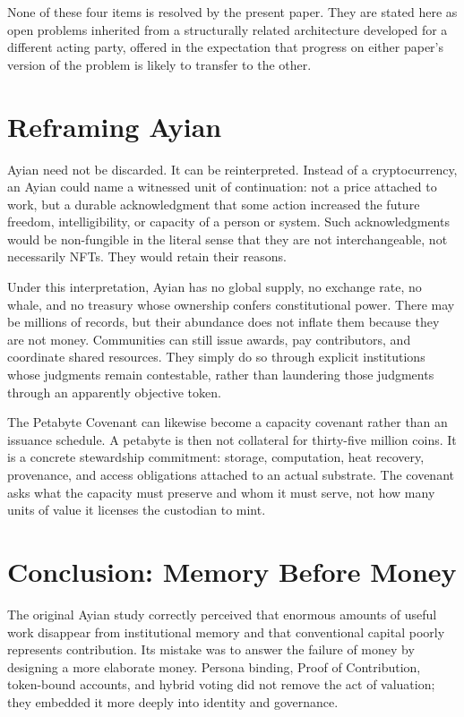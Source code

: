 \documentclass[11pt,oneside]{article}
\theoremstyle{plain}
\theoremstyle{definition}
\begin{document}
None of these four items is resolved by the present paper. They are stated here as open problems inherited from a structurally related architecture developed for a different acting party, offered in the expectation that progress on either paper's version of the problem is likely to transfer to the other.

\section{Reframing Ayian}

Ayian need not be discarded. It can be reinterpreted. Instead of a cryptocurrency, an Ayian could name a witnessed unit of continuation: not a price attached to work, but a durable acknowledgment that some action increased the future freedom, intelligibility, or capacity of a person or system. Such acknowledgments would be non-fungible in the literal sense that they are not interchangeable, not necessarily NFTs. They would retain their reasons.

Under this interpretation, Ayian has no global supply, no exchange rate, no whale, and no treasury whose ownership confers constitutional power. There may be millions of records, but their abundance does not inflate them because they are not money. Communities can still issue awards, pay contributors, and coordinate shared resources. They simply do so through explicit institutions whose judgments remain contestable, rather than laundering those judgments through an apparently objective token.

The Petabyte Covenant can likewise become a capacity covenant rather than an issuance schedule. A petabyte is then not collateral for thirty-five million coins. It is a concrete stewardship commitment: storage, computation, heat recovery, provenance, and access obligations attached to an actual substrate. The covenant asks what the capacity must preserve and whom it must serve, not how many units of value it licenses the custodian to mint.

\section{Conclusion: Memory Before Money}

The original Ayian study correctly perceived that enormous amounts of useful work disappear from institutional memory and that conventional capital poorly represents contribution. Its mistake was to answer the failure of money by designing a more elaborate money. Persona binding, Proof of Contribution, token-bound accounts, and hybrid voting did not remove the act of valuation; they embedded it more deeply into identity and governance.
\end{document}
